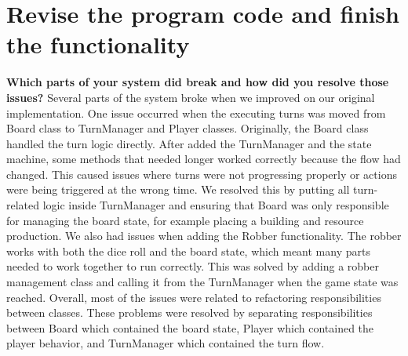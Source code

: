 \section{Revise the program code and finish the functionality}

\textbf{Which parts of your system did break and how did you resolve those issues?}
\newline \newline
Several parts of the system broke when we improved on our original implementation. 
\newline\newline
One issue occurred when the executing turns was moved from Board class to TurnManager and Player classes. Originally, the Board class handled the turn logic directly. After added the TurnManager and the state machine, some methods that needed longer worked correctly because the flow had changed. This caused issues where turns were not progressing properly or actions were being triggered at the wrong time. We resolved this by putting all turn-related logic inside TurnManager and ensuring that Board was only responsible for managing the board state, for example placing a building and resource production.
\newline\newline
We also had issues when adding the Robber functionality. The robber works with both the dice roll and the board state, which meant many parts needed to work together to run correctly. This was solved by adding a robber management class and calling it from the TurnManager when the game state was reached.
\newline\newline
Overall, most of the issues were related to refactoring responsibilities between classes. These problems were resolved by separating responsibilities between Board which contained the board state, Player which contained the player behavior, and TurnManager which contained the turn flow.
\newline\newline

